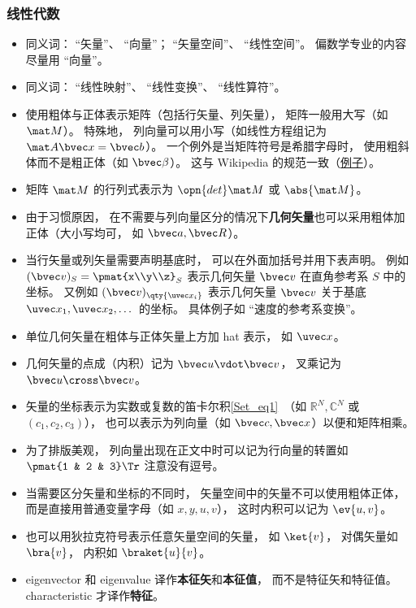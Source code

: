 \subsubsection{线性代数}
\begin{itemize}
\item 同义词： “矢量”、 “向量”； “矢量空间”、 “线性空间”。 偏数学专业的内容尽量用 “向量”。
\item 同义词： “线性映射”、 “线性变换”、 “线性算符”。
\item 使用粗体与正体表示矩阵（包括行矢量、列矢量）， 矩阵一般用大写（如 $\mat M$）。 特殊地， 列向量可以用小写（如线性方程组记为 $\mat A \bvec x = \bvec b$）。 一个例外是当矩阵符号是希腊字母时， 使用粗斜体而不是粗正体（如 $\bvec \beta$）。 这与 Wikipedia 的规范一致（\href{https://en.wikipedia.org/wiki/Angular_acceleration}{例子}）。
\item 矩阵 $\mat M$ 的行列式表示为 $\opn{det}\mat M$ 或 $\abs{\mat M}$。
\item 由于习惯原因， 在不需要与列向量区分的情况下\textbf{几何矢量}也可以采用粗体加正体（大小写均可， 如 $\bvec a, \bvec R$）。
\item 当行矢量或列矢量需要声明基底时， 可以在外面加括号并用下表声明。 例如 $(\bvec v)_S = \pmat{x\\y\\z}_S$ 表示几何矢量 $\bvec v$ 在直角参考系 $S$ 中的坐标。 又例如 $(\bvec v)_{\qty{\uvec x_i}}$ 表示几何矢量 $\bvec v$ 关于基底 $\uvec x_1, \uvec x_2, \dots$ 的坐标。 具体例子如 “速度的参考系变换”。
\item 单位几何矢量在粗体与正体矢量上方加 hat 表示， 如 $\uvec x$。
\item 几何矢量的点成（内积）记为 $\bvec u \vdot \bvec v$， 叉乘记为 $\bvec u \cross \bvec v$。
\item 矢量的坐标表示为实数或复数的笛卡尔积\autoref{Set_eq1}~（如 $\mathbb R^N, \mathbb C^N$ 或 $(c_1, c_2, c_3)$）， 也可以表示为列向量（如 $\bvec c, \bvec x$）以便和矩阵相乘。
\item 为了排版美观， 列向量出现在正文中时可以记为行向量的转置如 $\pmat{1 & 2 & 3}\Tr$ 注意没有逗号。
\item 当需要区分矢量和坐标的不同时， 矢量空间中的矢量不可以使用粗体正体， 而是直接用普通变量字母（如 $x, y, u, v$）， 这时内积可以记为 $\ev{u, v}$。
\item 也可以用狄拉克符号表示任意矢量空间的矢量， 如 $\ket{v}$， 对偶矢量如 $\bra{v}$， 内积如 $\braket{u}{v}$。
\item eigenvector 和 eigenvalue 译作\textbf{本征矢}和\textbf{本征值}， 而不是特征矢和特征值。 characteristic 才译作\textbf{特征}。
\end{itemize}

